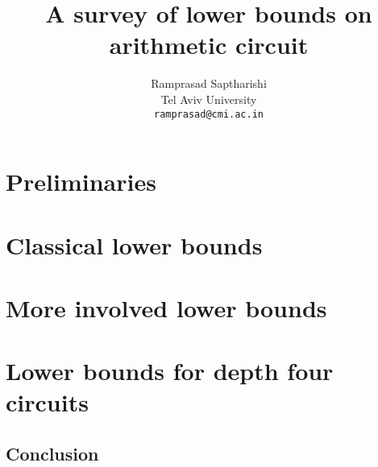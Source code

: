 \documentclass[12pt]{report}
\begin{document}
\title{A survey of lower bounds on arithmetic circuit}
\author{Ramprasad Saptharishi\\Tel Aviv University\\
{\tt ramprasad@cmi.ac.in}}
\maketitle 

\begin{abstract}
\lipsum[1-2]
\end{abstract}


\tableofcontents
{}

\part{Preliminaries}









\part{Classical lower bounds}





\part{More involved lower bounds}





\part{Lower bounds for depth four circuits}





\chapter{Conclusion}




\end{document}
